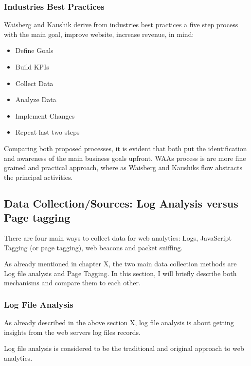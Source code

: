 \subsubsection{Industries Best Practices}

Waisberg and Kaushik derive from industries best practices a five step process with the main goal, improve website, increase revenue, in mind:%

\begin{itemize}
\item Define Goals
\item Build KPIs
\item Collect Data
\item Analyze Data
\item Implement Changes
\item Repeat last two steps
\end{itemize}


Comparing both proposed processes, it is evident that both put the identification and awareness of the main business goals upfront.
WAAs process is are more fine grained and practical approach, where as Waisberg and Kaushiks flow abstracts the principal activities.





\subsection{Data Collection/Sources: Log Analysis versus Page tagging}

There are four main ways to collect data for web analytics: Logs, JavaScript Tagging (or page tagging), web beacons and packet sniffing. %

As already mentioned in chapter X,  the two main data collection methods are Log file analysis and Page Tagging.
In this section, I will briefly describe both mechanisms and compare them to each other.


\subsubsection{Log File Analysis}

As already described in the above section X, log file analysis is about getting insights from the web servers log files records.

Log file analysis is considered to be the traditional and original approach to web analytics. %

